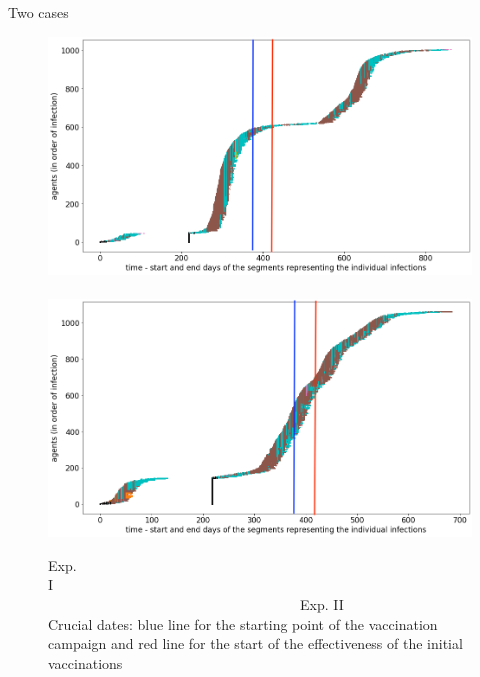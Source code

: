 \documentclass[8pt]{beamer}
\begin{document}
\begin{frame}{Two cases}

\begin{figure}[H]
\center
\includegraphics[scale=0.14]{CaseForGA_I_base.png}~~~\includegraphics[scale=0.14]{CaseForGA_II_base.png}
\caption{Exp. I~~~~~~~~~~~~~~~~~~~~~~~~~~~~~~~~~~~~~~~~~~~~~~~~~~~~~~~~~~~~~~~~~~~~~~~~~~~~~~~~~~~~~~~~~~~~~~~Exp. II\\Crucial dates: blue line for the starting point of the vaccination campaign and red line for the start of the effectiveness of the initial vaccinations}
\label{twoCases}
\end{figure}

\end{frame}
\end{document}
